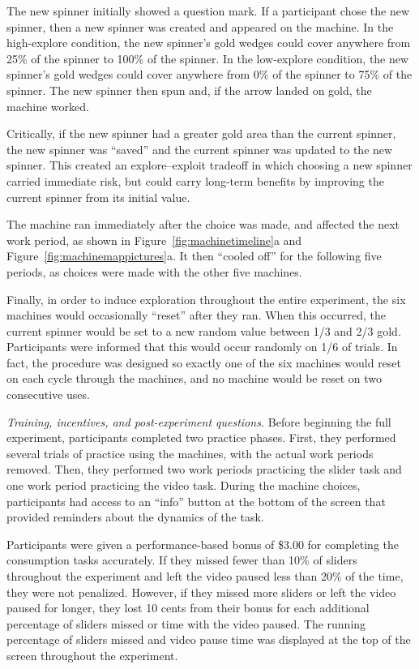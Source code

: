 \documentclass[10pt,letterpaper]{article}
\begin{document}
The new spinner initially showed a question mark. If a participant chose the
new spinner, then a new spinner was
created and appeared on the machine. In the high-explore condition, the new spinner's gold wedges could cover
anywhere from 25\% of the spinner to 100\% of the spinner. In the low-explore condition, the new spinner's gold wedges could cover
anywhere from 0\% of the spinner to 75\% of the spinner. The new spinner then
spun and, if the arrow landed on gold, the machine worked.

Critically, if the new spinner had a greater gold area than the current
spinner, the new spinner was ``saved'' and the current spinner was
updated to the new spinner.  This created an explore--exploit tradeoff in which 
choosing a new spinner carried immediate risk, but could carry long-term
benefits by improving the current spinner from its initial value.

The machine ran immediately after the choice was
made, and affected the next work period, as shown in
Figure~\ref{fig:machinetimeline}a and Figure~\ref{fig:machinemappictures}a. It then ``cooled off'' for the
following five periods, as choices were made with the other five machines.

Finally, in order to induce exploration throughout the entire experiment, the
six machines would occasionally ``reset'' after they ran. When this occurred,
the current spinner would be set to a new random value between 1/3 and 2/3 gold.
Participants were informed that this would occur randomly on
1/6 of trials. In fact, the procedure was designed so exactly one of the six
machines would reset on each cycle through the machines, and no machine would be
reset on two consecutive uses.



\emph{Training, incentives, and post-experiment questions.}
Before beginning the full experiment, participants completed two
practice phases. First, they performed several trials of practice using the
machines, with the actual work periods removed. Then, they performed two work
periods practicing the slider task and one work period practicing the video task.
During the machine choices, participants had access to an ``info'' button at the
bottom of the screen that provided reminders about the dynamics of the task.

Participants were given a performance-based bonus of \$3.00 for completing the
consumption tasks accurately. If they missed fewer than 10\% of sliders throughout
the experiment and left the video paused less than 20\% of the time, they were
not penalized. However, if they missed more sliders or left the video paused for
longer, they lost 10 cents from their bonus for each additional percentage of
sliders missed or time with the video paused. The running percentage of sliders
missed and video pause time was displayed at the top of the screen throughout
the experiment.
\end{document}
